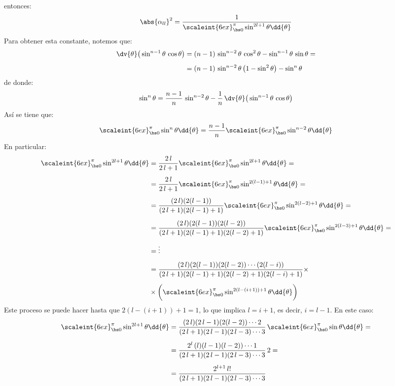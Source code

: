 entonces:
\begin{align}
\abs{\alpha_{ll}}^{2} = \dfrac{1}{\displaystyle \scaleint{6ex}_{\bs 0}^{\pi} \sin^{2l+1} \theta \dd{\theta}}
\label{eq:ecuacion_10_166}
\end{align}
Para obtener esta constante, notemos que:
\begin{align*}
\dv{\theta} \big( \sin^{n-1} \theta \, \cos \theta \big) &= (n - 1) \, \sin^{n-2} \theta \, \cos^{2} \theta - \sin^{n-1} \theta \, \sin \theta = \\[0.5em]
&= (n - 1) \, \sin^{n-2} \theta \, \big( 1 - \sin^{2} \theta \big) - \sin^{n} \theta
\end{align*}
de donde:
\begin{align}
\sin^{n} \theta = \dfrac{n - 1}{n} \, \sin^{n-2} \theta - \dfrac{1}{n} \, \dv{\theta} \big( \sin^{n-1} \theta \, \cos \theta \big)
\label{eq:ecuacion_10_167}
\end{align}
Así se tiene que:
\begin{align}
\scaleint{6ex}_{\bs 0}^{\pi} \sin^{n} \theta \dd{\theta} = \dfrac{n - 1}{n} \scaleint{6ex}_{\bs 0}^{\pi} \sin^{n-2} \theta \dd{\theta}
\label{eq:ecuacion_10_168}
\end{align}
En particular:
\begin{align*}
\scaleint{6ex}_{\bs 0}^{\pi} \sin^{2l+1} \theta \dd{\theta} &= \dfrac{2 \, l}{2 \, l + 1} \scaleint{6ex}_{\bs 0}^{\pi} \sin^{2l+1} \theta \dd{\theta} = \\[0.5em]
&= \dfrac{2 \, l}{2 \, l + 1} \scaleint{6ex}_{\bs 0}^{\pi} \sin^{2(l-1)+1} \theta \dd{\theta} = \\[0.5em]
&= \dfrac{(2 \, l)(2 (l - 1))}{(2 \, l + 1)(2 (l - 1) + 1)} \scaleint{6ex}_{\bs 0}^{\pi} \sin^{2(l-2)+1} \theta \dd{\theta} = \\[0.5em]
&= \dfrac{(2 \, l)(2 (l - 1))(2 (l - 2))}{(2 \, l + 1)(2 (l - 1) + 1)(2(l - 2) + 1)} \scaleint{6ex}_{\bs 0}^{\pi} \sin^{2(l-3)+1} \theta \dd{\theta} = \\[0.5em]
&= \vdots \\[0.5em]
&= \dfrac{(2 \, l)(2 (l - 1))(2 (l - 2)) \cdots (2 (l - i))}{(2 \, l + 1)(2 (l - 1) + 1)(2(l - 2) + 1)(2(l-i) + 1)} \times \\[0.5em]
&\times \bigg( \scaleint{6ex}_{\bs 0}^{\pi} \sin^{2(l-(i+1))+1} \theta \dd{\theta} \bigg)
\end{align*}
Este proceso se puede hacer hasta que $2 (l - (i + 1)) + 1 = 1 $, lo que implica $l = i + 1$, es decir, $i = l - 1$. En este caso:
\begin{align*}
\scaleint{6ex}_{\bs 0}^{\pi} \sin^{2l+1} \theta \dd{\theta} &= \dfrac{( 2 \, l) (2 \, l - 1)(2 (l - 2)) \cdots 2}{(2 \, l + 1)( 2 \, l - 1)(2 \, l - 3) \cdots 3} \, \scaleint{6ex}_{\bs 0}^{\pi} \sin \theta \dd{\theta} = \\[0.5em]
&= \dfrac{ 2^{l} \, (l) (l - 1)(l - 2)) \cdots 1}{(2 \, l + 1)( 2 \, l - 1)(2 \, l - 3) \cdots 3} \, 2 = \\[0.5em]
&= \dfrac{2^{l+1} \, l!}{(2 \, l + 1)( 2 \, l - 1)(2 \, l - 3) \cdots 3}
\end{align*}
